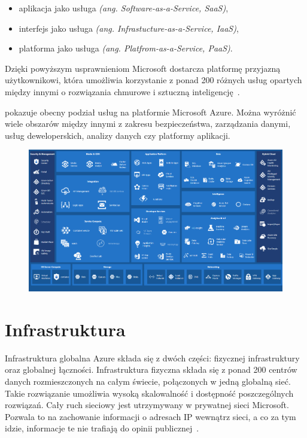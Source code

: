 \begin{itemize}
    \item aplikacja jako usługa \textit{(ang. Software-as-a-Service, SaaS)},
    \item interfejs jako usługa \textit{(ang. Infrastucture-as-a-Service, IaaS)},
    \item platforma jako usługa \textit{(ang. Platfrom-as-a-Service, PaaS)}.
\end{itemize}
Dzięki powyższym usprawnieniom Microsoft dostarcza platformę przyjazną użytkownikowi, która umożliwia korzystanie z ponad 200 różnych usług opartych między innymi o rozwiązania chmurowe i sztuczną inteligencję~\cite{Roosevelt2022, MicrosoftAzurec, Datashift}.

\vfill
\pagebreak

 pokazuje obecny podział usług na platformie Microsoft Azure. Można wyróżnić wiele obszarów między innymi z zakresu bezpieczeństwa, zarządzania danymi, usług deweloperskich, analizy danych czy platformy aplikacji.

\begin{figure}[H]
    \includegraphics[width=\textwidth]{images/ms_azure}
    \label{fig:ms-azure}
\end{figure}

\section{Infrastruktura}
Infrastruktura globalna Azure składa się z dwóch części: fizycznej infrastruktury oraz globalnej łączności. Infrastruktura fizyczna składa się z ponad 200 centrów danych rozmieszczonych na całym świecie, połączonych w jedną globalną sieć. Takie rozwiązanie umożliwia wysoką skalowalność i dostępność poszczególnych rozwiązań. Cały ruch sieciowy jest utrzymywany w prywatnej sieci Microsoft. Pozwala to na zachowanie informacji o adresach IP wewnątrz sieci, a co za tym idzie, informacje te nie trafiają do opinii publicznej~\cite{MicrosoftAzureb}.\\

